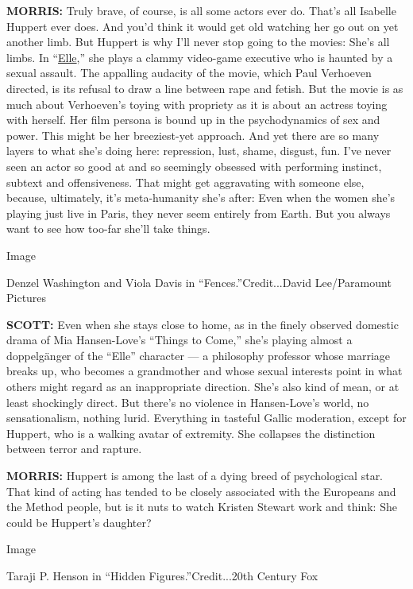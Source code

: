 \textbf{MORRIS:} Truly brave, of course, is all some actors ever do.
That's all Isabelle Huppert ever does. And you'd think it would get old
watching her go out on yet another limb. But Huppert is why I'll never
stop going to the movies: She's all limbs. In
``\href{https://www.nytimes3xbfgragh.onion/2016/11/11/movies/elle-review-isabelle-huppert.html}{Elle},''
she plays a clammy video-game executive who is haunted by a sexual
assault. The appalling audacity of the movie, which Paul Verhoeven
directed, is its refusal to draw a line between rape and fetish. But the
movie is as much about Verhoeven's toying with propriety as it is about
an actress toying with herself. Her film persona is bound up in the
psychodynamics of sex and power. This might be her breeziest-yet
approach. And yet there are so many layers to what she's doing here:
repression, lust, shame, disgust, fun. I've never seen an actor so good
at and so seemingly obsessed with performing instinct, subtext and
offensiveness. That might get aggravating with someone else, because,
ultimately, it's meta-humanity she's after: Even when the women she's
playing just live in Paris, they never seem entirely from Earth. But you
always want to see how too-far she'll take things.

Image

Denzel Washington and Viola Davis in ``Fences.''Credit...David
Lee/Paramount Pictures

\textbf{SCOTT:} Even when she stays close to home, as in the finely
observed domestic drama of Mia Hansen-Love's ``Things to Come,'' she's
playing almost a doppelgänger of the ``Elle'' character --- a philosophy
professor whose marriage breaks up, who becomes a grandmother and whose
sexual interests point in what others might regard as an inappropriate
direction. She's also kind of mean, or at least shockingly direct. But
there's no violence in Hansen-Love's world, no sensationalism, nothing
lurid. Everything in tasteful Gallic moderation, except for Huppert, who
is a walking avatar of extremity. She collapses the distinction between
terror and rapture.

\textbf{MORRIS:} Huppert is among the last of a dying breed of
psychological star. That kind of acting has tended to be closely
associated with the Europeans and the Method people, but is it nuts to
watch Kristen Stewart work and think: She could be Huppert's daughter?

Image

Taraji P. Henson in ``Hidden Figures.''Credit...20th Century Fox

